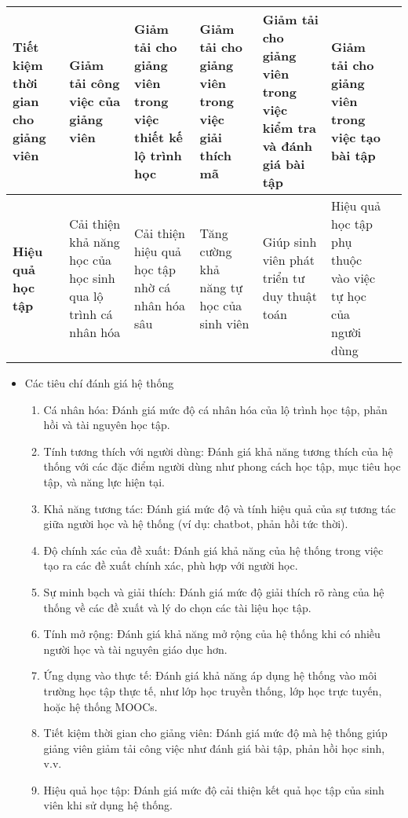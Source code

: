 \begin{table}[ht]
{\begin{tabular}{|p{3.5cm}|p{3.5cm}|p{3.5cm}|p{3.5cm}|p{3.5cm}|p{3.5cm}|p{3.5cm}|}
    \textbf{Tiết kiệm thời gian cho giảng viên} & Giảm tải công việc của giảng viên & Giảm tải cho giảng viên trong việc thiết kế lộ trình học & Giảm tải cho giảng viên trong việc giải thích mã & Giảm tải cho giảng viên trong việc kiểm tra và đánh giá bài tập & Giảm tải cho giảng viên trong việc tạo bài tập \\ \hline
    \textbf{Hiệu quả học tập} & Cải thiện khả năng học của học sinh qua lộ trình cá nhân hóa & Cải thiện hiệu quả học tập nhờ cá nhân hóa sâu & Tăng cường khả năng tự học của sinh viên & Giúp sinh viên phát triển tư duy thuật toán & Hiệu quả học tập phụ thuộc vào việc tự học của người dùng \\ \hline
    \end{tabular}
    }
    \end{table}
\begin{itemize}
    \item Các tiêu chí đánh giá hệ thống
    \begin{enumerate}
        \item Cá nhân hóa: Đánh giá mức độ cá nhân hóa của lộ trình học tập, phản hồi và tài nguyên học tập.
        \item Tính tương thích với người dùng: Đánh giá khả năng tương thích của hệ thống với các đặc điểm người dùng như phong cách học tập, mục tiêu học tập, và năng lực hiện tại.
        \item Khả năng tương tác: Đánh giá mức độ và tính hiệu quả của sự tương tác giữa người học và hệ thống (ví dụ: chatbot, phản hồi tức thời).
        \item Độ chính xác của đề xuất: Đánh giá khả năng của hệ thống trong việc tạo ra các đề xuất chính xác, phù hợp với người học.
        \item Sự minh bạch và giải thích: Đánh giá mức độ giải thích rõ ràng của hệ thống về các đề xuất và lý do chọn các tài liệu học tập.
        \item Tính mở rộng: Đánh giá khả năng mở rộng của hệ thống khi có nhiều người học và tài nguyên giáo dục hơn.
        \item Ứng dụng vào thực tế: Đánh giá khả năng áp dụng hệ thống vào môi trường học tập thực tế, như lớp học truyền thống, lớp học trực tuyến, hoặc hệ thống MOOCs.
        \item Tiết kiệm thời gian cho giảng viên: Đánh giá mức độ mà hệ thống giúp giảng viên giảm tải công việc như đánh giá bài tập, phản hồi học sinh, v.v.
        \item Hiệu quả học tập: Đánh giá mức độ cải thiện kết quả học tập của sinh viên khi sử dụng hệ thống.
    \end{enumerate}
\end{itemize}
